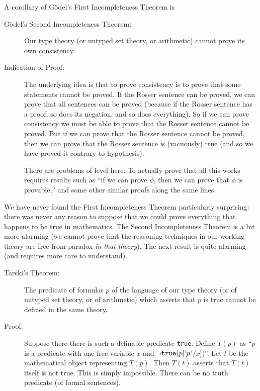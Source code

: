 \documentclass[12pt]{book}
\begin{document}
A corollary of G\"odel's First Incompleteness Theorem is 

\begin{description}

\item[G\"odel's Second Incompleteness Theorem:] Our type theory (or
untyped set theory, or arithmetic) cannot prove its own consistency.

\item[Indication of Proof:] The underlying idea is that to
prove consistency is to prove that some statements cannot be proved.
If the Rosser sentence can be proved, we can prove that all sentences
can be proved (because if the Rosser sentence has a proof, so does its
negation, and so does everything).  So if we can prove consistency we
must be able to prove that the Rosser sentence cannot be proved.  But
if we can prove that the Rosser sentence cannot be proved, then we can
prove that the Rosser sentence is (vacuously) true (and so we have
proved it contrary to hypothesis).

There are problems of level here.  To actually prove that all this
works requires results such as ``if we can prove $\phi$, then we can
prove that $\phi$ is provable,'' and some other similar proofs along
the same lines.

\end{description}

We have never found the First Incompleteness Theorem particularly
surprising: there was never any reason to suppose that we could prove
everything that happens to be true in mathematics.  The Second
Incompleteness Theorem is a bit more alarming (we cannot prove that
the reasoning techniques in our working theory are free from paradox
{\em in that theory\/}).  The next result is quite alarming (and
requires more care to understand).

\begin{description}

\item[Tarski's Theorem:]  The predicate of formulas $p$ of the language
of our type theory (or of untyped set theory, or of arithmetic) which asserts
that $p$ is true cannot be defined in the same theory.

\item[Proof:]  Suppose there there is such a definable predicate {\tt true}.
Define $T(p)$ as ``$p$ is a predicate with one free variable $x$ and
$\neg{\tt true}(p[`p$'$/x])$''.  Let $t$ be the mathematical object representing
$T(p)$.  Then $T(t)$ asserts that $T(t)$ itself is not true.  This is simply impossible.  There can be no truth predicate (of formal sentences).

\end{description}
\end{document}
